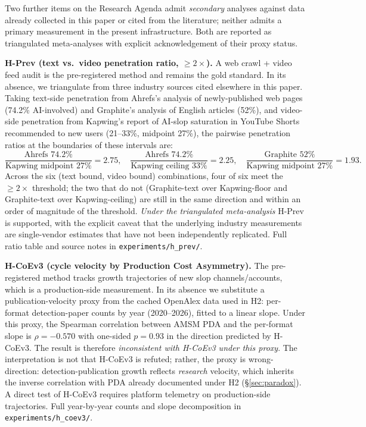 \documentclass[12pt,a4paper]{article}
\begin{document}
Two further items on the Research Agenda admit \emph{secondary} analyses against data already collected in this paper or cited from the literature; neither admits a primary measurement in the present infrastructure. Both are reported as triangulated meta-analyses with explicit acknowledgement of their proxy status.

\textbf{H-Prev (text vs.\ video penetration ratio, $\geq 2\times$).} A web crawl + video feed audit is the pre-registered method and remains the gold standard. In its absence, we triangulate from three industry sources cited elsewhere in this paper. Taking text-side penetration from Ahrefs's analysis of newly-published web pages (74.2\% AI-involved) and Graphite's analysis of English articles (52\%), and video-side penetration from Kapwing's report of AI-slop saturation in YouTube Shorts recommended to new users (21--33\%, midpoint 27\%), the pairwise penetration ratios at the boundaries of these intervals are:
\[
\frac{\text{Ahrefs 74.2\%}}{\text{Kapwing midpoint 27\%}} = 2.75, \quad
\frac{\text{Ahrefs 74.2\%}}{\text{Kapwing ceiling 33\%}} = 2.25, \quad
\frac{\text{Graphite 52\%}}{\text{Kapwing midpoint 27\%}} = 1.93.
\]
Across the six (text bound, video bound) combinations, four of six meet the $\geq 2\times$ threshold; the two that do not (Graphite-text over Kapwing-floor and Graphite-text over Kapwing-ceiling) are still in the same direction and within an order of magnitude of the threshold. \emph{Under the triangulated meta-analysis} H-Prev is supported, with the explicit caveat that the underlying industry measurements are single-vendor estimates that have not been independently replicated. Full ratio table and source notes in \texttt{experiments/h\_prev/}.

\textbf{H-CoEv3 (cycle velocity by Production Cost Asymmetry).} The pre-registered method tracks growth trajectories of new slop channels/accounts, which is a production-side measurement. In its absence we substitute a publication-velocity proxy from the cached OpenAlex data used in H2: per-format detection-paper counts by year (2020--2026), fitted to a linear slope. Under this proxy, the Spearman correlation between AMSM PDA and the per-format slope is $\rho = -0.570$ with one-sided $p = 0.93$ in the direction predicted by H-CoEv3. The result is therefore \emph{inconsistent with H-CoEv3 under this proxy}. The interpretation is not that H-CoEv3 is refuted; rather, the proxy is wrong-direction: detection-publication growth reflects \emph{research} velocity, which inherits the inverse correlation with PDA already documented under H2 (\S\ref{sec:paradox}). A direct test of H-CoEv3 requires platform telemetry on production-side trajectories. Full year-by-year counts and slope decomposition in \texttt{experiments/h\_coev3/}.
\end{document}
